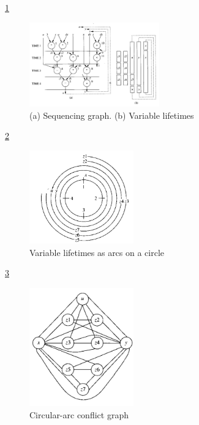 \ref{fig:Sequencing_graph}
\begin{figure}[h]
    \centering
    \includegraphics[width=0.5\textwidth]{Sequencing_graph}
    \caption{ (a) Sequencing graph. (b) Variable lifetimes \cite{b1}}
    \label{fig:Sequencing_graph}
\end{figure}

\ref{fig:Variable_lifetimes_as_arcs_on_a_circle}
\begin{figure}[h]
    \centering
    \includegraphics[width=0.4\textwidth]{Variable_lifetimes_as_arcs_on_a_circle}
    \caption{ Variable lifetimes as arcs on a circle \cite{b1}}
    \label{fig:Variable_lifetimes_as_arcs_on_a_circle}
\end{figure}

\ref{fig:Circular_arc_confliCr_graph}
\begin{figure}[h]
    \centering
    \includegraphics[width=0.4\textwidth]{Circular_arc_confliCr_graph}
    \caption{ Circular-arc conflict graph \cite{b1}}
    \label{fig:Circular_arc_confliCr_graph}
\end{figure}

